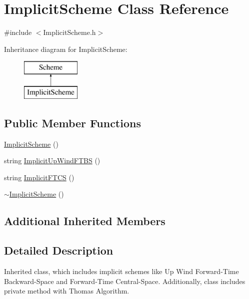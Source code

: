 \hypertarget{class_implicit_scheme}{}\section{Implicit\+Scheme Class Reference}
\label{class_implicit_scheme}


{\ttfamily \#include $<$Implicit\+Scheme.\+h$>$}

Inheritance diagram for Implicit\+Scheme\+:\begin{figure}[H]
\begin{center}
\leavevmode
\includegraphics[height=2.000000cm]{class_implicit_scheme}
\end{center}
\end{figure}
\subsection*{Public Member Functions}
\begin{DoxyCompactItemize}
\item 
\mbox{\hyperlink{class_implicit_scheme_a7bb3a64ab8d7ca0b58ed4ba9817b8c12}{Implicit\+Scheme}} ()
\item 
string \mbox{\hyperlink{class_implicit_scheme_ab8311a005d69690622e0ddaa0dcff94d}{Implicit\+Up\+Wind\+F\+T\+BS}} ()
\item 
string \mbox{\hyperlink{class_implicit_scheme_afd2b8e73e914a04c326b8cba0d5810ce}{Implicit\+F\+T\+CS}} ()
\item 
\mbox{\hyperlink{class_implicit_scheme_aca61347d2335e248678f7f3060785762}{$\sim$\+Implicit\+Scheme}} ()
\end{DoxyCompactItemize}
\subsection*{Additional Inherited Members}


\subsection{Detailed Description}
Inherited class, which includes implicit schemes like Up Wind Forward-\/\+Time Backward-\/\+Space and Forward-\/\+Time Central-\/\+Space. Additionally, class includes private method with Thomas Algorithm. 

